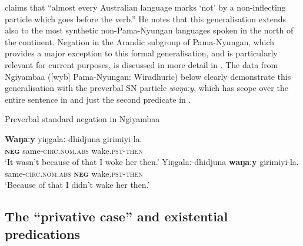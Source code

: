 \documentclass[output=paper]{langsci/langscibook}
\begin{document}
\citet[82]{Dixon2002a} claims that ``almost every Australian language marks
`not' by a non-inflecting particle which goes before the verb.'' He notes
that this generalisation extends also to the most synthetic
non-Pama-Nyungan languages spoken in the north of the continent. Negation
in the Arandic subgroup of Pama-Nyungan, which provides a major exception
to this formal generalisation, and is particularly relevant for current
purposes, is discussed in more detail in . The data
from Ngiyambaa ([wyb] Pama-Nyungan: Wiradhuric) below clearly demonstrate
this generalisation with the preverbal SN particle \textit{waŋaːy}, which
has scope over the entire sentence in  and just the second predicate in .
\begin{exe}\ex\label{sn-wyb} Preverbal standard negation in Ngiyambaa \citep[239]{Donaldson1980}
    \begin{xlist}
\ex\label{ex:austr-Ngiyambaa-wake-a}
    \gll \textbf{Waŋaːy} yiŋgalaː-dhi\textdblhyphen dju\textdblhyphen na girimiyi-la.\\
\textsc{\textbf{neg}} same-\textsc{circ}.\textsc{nom}.\textsc{abs} wake\textsc{.pst-then}\\
\glt `It wasn't because of that I woke her then.'
\ex\label{ex:austr-Ngiyambaa-wake-b}
    \gll Yiŋgalaː-dhi\textdblhyphen dju\textdblhyphen na \textbf{waŋaːy} girimiyi-la.\\
same-\textsc{circ}.\textsc{nom}.\textsc{abs} \textsc{\textbf{neg}} wake\textsc{.pst-then}\\
\glt `Because of that I didn't wake her then.'
    \end{xlist}\end{exe}

\subsection{The ``privative case'' and existential predications}\label{sec:austr-2.2}
\end{document}
